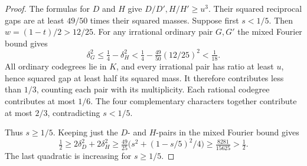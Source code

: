 \documentclass[11pt,reqno]{amsart}
\theoremstyle{remark}\newtheorem{remark}[theorem]{Remark}
\numberwithin{equation}{section}
\begin{document}
\begin{proof}
The formulas for $D$ and $H$ give $D/D',H/H'\ge u^3$. Their squared
reciprocal gaps are at least $49/50$ times their squared masses.
Suppose first $s<1/5$. Then $w=(1-t)/2>12/25$. For any irrational
ordinary pair $G,G'$ the mixed Fourier bound gives
\[
 \delta_G^2\le\tfrac14-\delta_H^2
       <\tfrac14-\tfrac{49}{50}(12/25)^2<\tfrac1{18}.
\]
All ordinary codegrees lie in $K$, and every irrational pair has
ratio at least $u$, hence squared gap at least half its squared mass.
It therefore contributes less than $1/3$, counting each pair with its
multiplicity. Each rational codegree contributes at most $1/6$.
The four complementary characters together contribute at most $2/3$,
contradicting $s<1/5$.

Thus $s\ge1/5$. Keeping just the $D$- and $H$-pairs in the mixed
Fourier bound gives
\[
 \tfrac12\ge2\delta_D^2+2\delta_H^2
  \ge\tfrac{49}{25}\bigl(s^2+(1-s/5)^2/4\bigr)
  \ge\tfrac{8281}{15625}>\tfrac12 .
\]
The last quadratic is increasing for $s\ge1/5$.
\end{proof}
\end{document}
